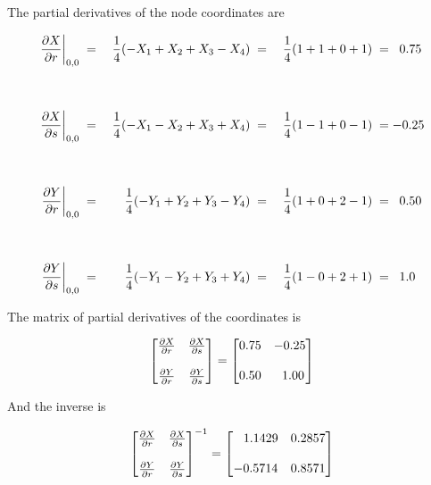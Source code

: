 The partial derivatives of the node coordinates are

\begin{align*}
\left. {\partial X \over \partial r}\right|_{0,0} \; & = & \; {1 \over 4} (-X_1 + X_2 + X_3 - X_4) \; & = & \; {1 \over 4} ( 1 + 1 + 0 + 1) \; & = \;\; 0.75 \\
\\
\\
\left. {\partial X \over \partial s}\right|_{0,0} \; & = & \; {1 \over 4} (-X_1 - X_2 + X_3 + X_4) \; & = & \; {1 \over 4} ( 1 - 1 + 0 - 1) \; & =  -0.25 \\
\\
\\
\left. {\partial Y \over \partial r}\right|_{0,0} \; & = & \; {1 \over 4} (-Y_1 + Y_2 + Y_3 - Y_4) \; & = & \; {1 \over 4} ( 1 + 0 + 2 - 1) \; & = \;\; 0.50 \\
\\
\\
\left. {\partial Y \over \partial s}\right|_{0,0} \; & = & \; {1 \over 4} (-Y_1 - Y_2 + Y_3 + Y_4) \; & = & \; {1 \over 4} ( 1 - 0 + 2 + 1) \; & = \;\; 1.0
\end{align*}

The matrix of partial derivatives of the coordinates is

\begin{eqnarray*}
\begin{bmatrix}
{\partial X \over \partial r} & {\partial X \over \partial s} \\
\\
{\partial Y \over \partial r} & {\partial Y \over \partial s} 
\end{bmatrix}
=
\begin{bmatrix}
0.75 & -0.25 \\
\\
0.50 & \;\; 1.00
\end{bmatrix}
\end{eqnarray*}

And the inverse is

\begin{eqnarray*}
\begin{bmatrix}
{\partial X \over \partial r} & {\partial X \over \partial s} \\
\\
{\partial Y \over \partial r} & {\partial Y \over \partial s} 
\end{bmatrix}^{-1}
=
\begin{bmatrix}
\;\;\; 1.1429 & 0.2857 \\
\\
-0.5714 & 0.8571
\end{bmatrix}
\end{eqnarray*}

